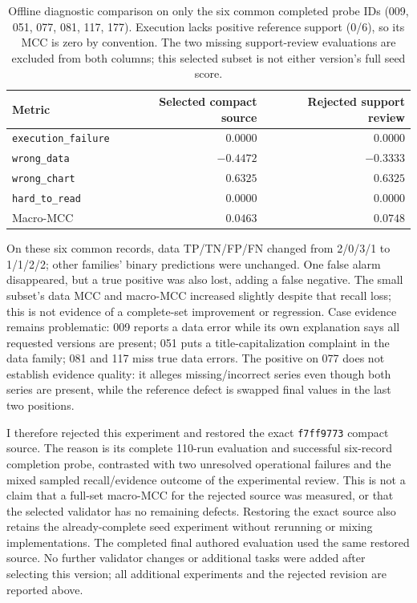 \documentclass[11pt]{article}
\begin{document}
\begin{table}[htbp]
\centering
\small
\begin{tabular}{lrr}
\toprule
Metric & Selected compact source & Rejected support review \\
\midrule
\texttt{execution\_failure} & $0.0000$ & $0.0000$ \\
\texttt{wrong\_data} & $-0.4472$ & $-0.3333$ \\
\texttt{wrong\_chart} & $0.6325$ & $0.6325$ \\
\texttt{hard\_to\_read} & $0.0000$ & $0.0000$ \\
Macro-MCC & $0.0463$ & $0.0748$ \\
\bottomrule
\end{tabular}
\caption{Offline diagnostic comparison on only the six common completed
probe IDs (009, 051, 077, 081, 117, 177). Execution lacks positive
reference support (0/6), so its MCC is zero by convention. The two missing
support-review evaluations are excluded from both columns; this selected
subset is not either version's full seed score.}
\label{tab:part4-rejected-proof-probe}
\end{table}

On these six common records, data TP/TN/FP/FN changed from
2/0/3/1 to 1/1/2/2; other families' binary predictions were unchanged.
One false alarm disappeared, but a true positive was also lost, adding
a false negative. The small subset's data MCC and macro-MCC increased
slightly despite that recall loss; this is not evidence of a complete-set
improvement or regression. Case evidence remains problematic:
009 reports a data error while its own explanation says all requested
versions are present; 051 puts a title-capitalization complaint in the
data family; 081 and 117 miss true data errors. The positive on 077 does
not establish evidence quality: it alleges missing/incorrect series even
though both series are present, while the reference defect is swapped
final values in the last two positions.

I therefore rejected this experiment and restored the exact
\texttt{f7ff9773} compact source. The reason is its complete 110-run
evaluation and successful six-record completion probe, contrasted with
two unresolved operational failures and the mixed sampled recall/evidence
outcome of the experimental review. This is not a claim that a full-set
macro-MCC for the rejected source was measured, or that the selected
validator has no remaining defects. Restoring the exact source also
retains the already-complete seed experiment without rerunning or
mixing implementations. The completed final authored evaluation used
the same restored source. No further validator changes or additional
tasks were added after selecting this version; all additional experiments
and the rejected revision are reported above.
\end{document}
